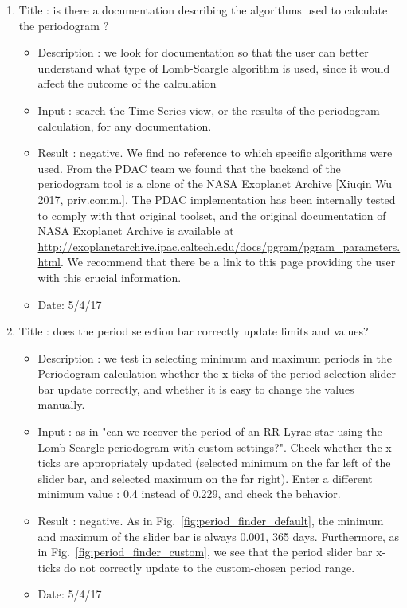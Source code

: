 \documentclass[DM,lsstdraft,toc]{lsstdoc}
\begin{document}
\begin{enumerate}
   \item Title : is there a documentation describing the algorithms used to calculate the periodogram ?
    \begin{itemize}
      \item Description : we look for documentation so that the user can better understand what type of Lomb-Scargle algorithm is used, since it would affect the outcome of the calculation
      \item Input : search the Time Series view, or the results of the periodogram calculation, for any documentation.
      \item Result : negative. We find no reference to which specific algorithms were used. From the PDAC team we found that the backend of the periodogram tool is a clone of the NASA Exoplanet Archive [Xiuqin Wu 2017, priv.comm.]. The PDAC implementation has been internally tested to comply with that original toolset,  and the original documentation of NASA Exoplanet Archive is available at \url{http://exoplanetarchive.ipac.caltech.edu/docs/pgram/pgram_parameters.html}. We recommend that there be a link to this page providing the user with this crucial information.
      \item Date: 5/4/17
    \end{itemize}

   \item Title : does the period selection bar correctly  update limits and values?
    \begin{itemize}
      \item Description : we test in selecting minimum and maximum periods in the Periodogram calculation whether the x-ticks of the period selection slider bar update correctly, and whether it is easy to change the values manually.
      \item Input : as in "can we recover the period of an RR Lyrae  star using the Lomb-Scargle periodogram with custom settings?". Check whether the x-ticks are appropriately updated (selected minimum on the far left of the slider bar,  and selected maximum on the far right). Enter a different minimum value : 0.4 instead of 0.229, and check the behavior.
      \item Result : negative.  As in Fig.~\ref{fig:period_finder_default}, the minimum and maximum of the slider bar is always 0.001, 365 days. Furthermore, as in Fig.~\ref{fig:period_finder_custom}, we see that the period slider bar x-ticks do not correctly update to the custom-chosen period range.
      \item Date: 5/4/17
    \end{itemize}



\end{enumerate}
\end{document}

